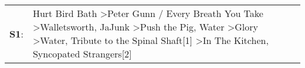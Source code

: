 \begin{supertabular}{p{0.03\textwidth}p{0.92\textwidth}}
 \textbf{S1}:  &  Hurt Bird Bath\textsuperscript{} \textgreater \enspace Peter Gunn / Every Breath You Take\textsuperscript{} \textgreater \enspace Walletsworth\textsuperscript{}, \enspace JaJunk\textsuperscript{} \textgreater \enspace Push the Pig\textsuperscript{}, \enspace Water\textsuperscript{} \textgreater \enspace Glory\textsuperscript{} \textgreater \enspace Water\textsuperscript{}, \enspace Tribute to the Spinal Shaft[1]\textsuperscript{} \textgreater \enspace In The Kitchen\textsuperscript{}, \enspace Syncopated Strangers[2]\textsuperscript{}  \enspace  \\
\end{supertabular}
